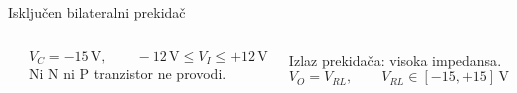 \begin{frame}[label=09_3-s065]{Isključen bilateralni prekidač}
\begin{columns}[c,onlytextwidth]
\begin{center}

\end{center}
\[V_C=-15\,\mathrm V,\qquad -12\,\mathrm V\le V_I\le+12\,\mathrm V\]
Ni N ni P tranzistor ne provodi.
\par Izlaz prekidača: \alert{visoka impedansa}.
\[V_O=V_{RL},\qquad V_{RL}\in[-15,+15]\,\mathrm V\]
\end{columns}
\end{frame}
